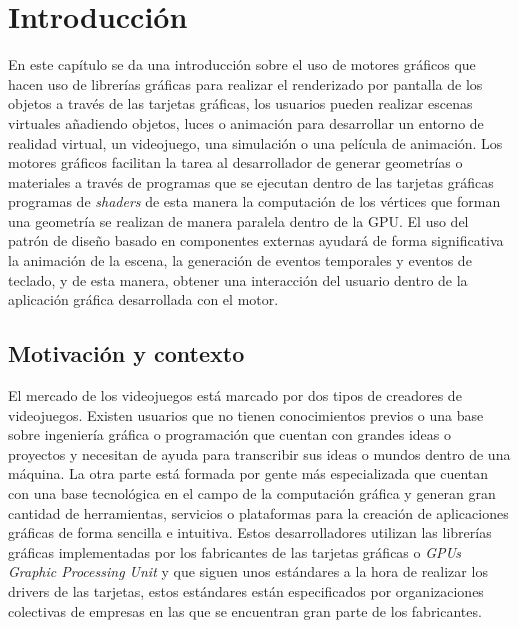 \documentclass[a4paper]{book}
\begin{document}

\cleardoublepage
\chapter{Introducción}
\label{sec:intro} %

En este capítulo se da una introducción sobre el uso de motores gráficos que hacen uso de librerías gráficas
para realizar el renderizado por pantalla de los objetos a través de las tarjetas gráficas, los usuarios
pueden realizar escenas virtuales añadiendo objetos, luces o animación para desarrollar un entorno
de realidad virtual, un videojuego, una simulación o una película de animación. Los motores gráficos facilitan
la tarea al desarrollador de generar geometrías o materiales a través de programas que se ejecutan dentro
de las tarjetas gráficas programas de \textit{shaders} de esta manera la computación de los vértices
que forman una geometría se realizan de manera paralela dentro de la GPU. El uso del patrón de diseño basado en
componentes externas ayudará de forma significativa la animación de la escena, la generación de eventos temporales
y eventos de teclado, y de esta manera, obtener una interacción del usuario dentro de la aplicación gráfica
desarrollada con el motor.

\section{Motivación y contexto}
\label{sec:}

El mercado de los videojuegos está marcado por dos tipos de creadores de videojuegos. Existen usuarios que no
tienen conocimientos previos o una base sobre ingeniería gráfica o programación que cuentan con grandes ideas o proyectos y
necesitan de ayuda para transcribir sus ideas o mundos dentro de una máquina. La otra parte está formada
por gente más especializada que cuentan con una base tecnológica en el campo de la computación gráfica y
generan gran cantidad de herramientas, servicios o plataformas para la creación de aplicaciones gráficas de
forma sencilla e intuitiva. Estos desarrolladores utilizan las librerías gráficas implementadas por los
fabricantes de las tarjetas gráficas o \textit{GPUs Graphic Processing Unit} y que siguen unos estándares
a la hora de realizar los drivers de las tarjetas, estos estándares están especificados por organizaciones 
colectivas de empresas en las que se encuentran gran parte de los fabricantes.
\end{document}
